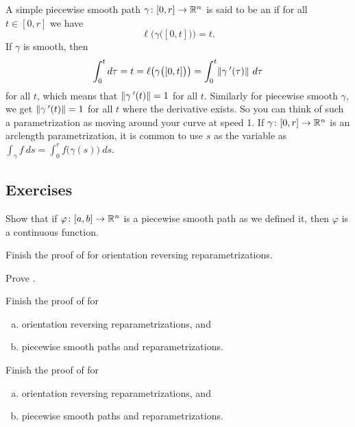 A simple piecewise smooth path $\gamma \colon [0,r] \to {\mathbb{R}}^n$ is
said to be an \emph{} if
for all $t \in [0,r]$ we have
\begin{equation*}
\ell\bigl( \gamma\bigl([0,t]\bigr) \bigr) = t .
\end{equation*}
If $\gamma$ is smooth, then
\begin{equation*}
\int_0^t d\tau =
t = \ell\bigl( \gamma\bigl([0,t]\bigr) \bigr) =
\int_0^t
\lVert {\gamma^{\:\prime}(\tau)} \rVert
~ d\tau
\end{equation*}
for all $t$,
which means that $\lVert {\gamma^{\:\prime}(t)} \rVert = 1$ for all $t$.
Similarly for piecewise smooth $\gamma$, we get
$\lVert {\gamma^{\:\prime}(t)} \rVert = 1$ for all $t$ where the derivative exists.
So you can think of such a parametrization as moving around your curve at speed
1.  If $\gamma \colon [0,r] \to {\mathbb{R}}^n$ is an arclength parametrization, it is
common to use $s$ as the variable as $\int_\gamma f ~ds
= \int_0^r f\bigl(\gamma(s)\bigr) ~ds$.

\subsection{Exercises}

\begin{exercise}
Show that if $\varphi \colon [a,b] \to {\mathbb{R}}^n$ is a piecewise smooth path as we
defined it, then $\varphi$ is a continuous function.
\end{exercise}

\begin{exercise}
Finish the proof of  for orientation
reversing reparametrizations.
\end{exercise}

\begin{exercise}
Prove .
\end{exercise}

\begin{exercise} \label{mv:exercise:pathpiece}
Finish the proof of 
for
\begin{enumerate}[a)]
\item
orientation reversing reparametrizations, and
\item
piecewise smooth paths
and reparametrizations.
\end{enumerate}
\end{exercise}

\begin{exercise} \label{mv:exercise:linepiece}
Finish the proof of 
for
\begin{enumerate}[a)]
\item
orientation reversing reparametrizations, and
\item
piecewise smooth paths
and reparametrizations.
\end{enumerate}
\end{exercise}

